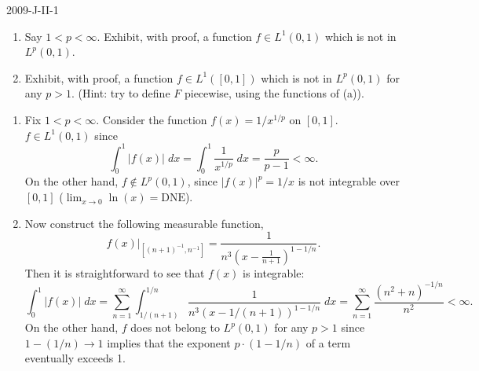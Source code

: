 \documentclass{article}
\begin{document}
	\begin{prb}{2009-J-II-1}
		$ $\newline\vspace{-0.65cm}
		\begin{enumerate}[itemsep =-2pt,label = (\alph{*})]
			\item Say $1 < p < \infty$. Exhibit, with proof, a function $f \in L^1(0,1)$ which is not in $L^p(0,1)$. 
			\item Exhibit, with proof, a function $f \in L^1([0,1])$ which is not in $L^p(0,1)$ for any $p > 1$. (Hint: try to define $F$ piecewise, using the functions of (a)). 
		\end{enumerate}
	\end{prb}
	\begin{enumerate}[itemsep =-2pt,label = (\alph{*})]
		\item Fix $1 <p < \infty$. Consider the function $f(x) = 1/x^{1/p}$ on $[0,1]$. $f \in L^1(0,1)$ since 
		\begin{equation*}
			\int_{0}^{1}|f(x)|\;dx = \int_{0}^{1}\frac{1}{x^{1/p}}\;dx =\frac{p}{p - 1} < \infty. 
		\end{equation*}
		On the other hand, $f \notin L^p(0,1)$, since $|f(x)|^p = 1/x$ is not integrable over $[0,1]$ ($\lim_{x \to 0}\ln(x) = \text{DNE}$). 
		\item Now construct the following measurable function, 
		\begin{equation*}
			f(x)|_{[(n + 1)^{-1}, n^{-1}]} = \frac{1}{n^{3}\left(x - \frac{1}{n + 1}\right)^{1 - 1/n}}. 
		\end{equation*}
		Then it is straightforward to see that $f(x)$ is integrable: 
		\begin{equation*}
			\int_{0}^{1}|f(x)|\;dx = \sum_{n = 1}^{\infty}\int_{1/(n + 1)}^{1/n}\frac{1}{n^3(x - 1/(n + 1))^{1 - 1/n}}\;dx = \sum_{n = 1}^{\infty}\frac{(n^2 + n)^{-1/n}}{n^2} < \infty. 
		\end{equation*}
		On the other hand, $f$ does not belong to $L^p(0,1)$ for any $p > 1$ since $1 - (1/n) \to 1$ implies that the exponent $p \cdot (1 - 1/n)$ of a term eventually exceeds 1. 
	\end{enumerate}
	
\end{document}
